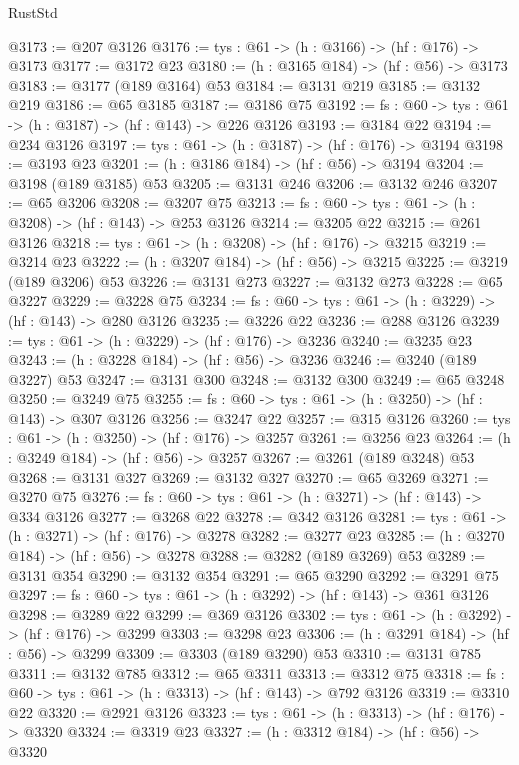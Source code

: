 \begin{lexlean}{RustStd}
\begin{coremodule}
@3173 := @207 @3126
@3176 := {tys : @61} -> (h : @3166) -> (hf : @176) -> @3173
@3177 := @3172 @23
@3180 := (h : @3165 @184) -> (hf : @56) -> @3173
@3183 := @3177 (@189 @3164) @53
@3184 := @3131 @219
@3185 := @3132 @219
@3186 := @65 @3185
@3187 := @3186 @75
@3192 := {fs : @60} -> {tys : @61} -> (h : @3187) -> (hf : @143) -> @226 @3126
@3193 := @3184 @22
@3194 := @234 @3126
@3197 := {tys : @61} -> (h : @3187) -> (hf : @176) -> @3194
@3198 := @3193 @23
@3201 := (h : @3186 @184) -> (hf : @56) -> @3194
@3204 := @3198 (@189 @3185) @53
@3205 := @3131 @246
@3206 := @3132 @246
@3207 := @65 @3206
@3208 := @3207 @75
@3213 := {fs : @60} -> {tys : @61} -> (h : @3208) -> (hf : @143) -> @253 @3126
@3214 := @3205 @22
@3215 := @261 @3126
@3218 := {tys : @61} -> (h : @3208) -> (hf : @176) -> @3215
@3219 := @3214 @23
@3222 := (h : @3207 @184) -> (hf : @56) -> @3215
@3225 := @3219 (@189 @3206) @53
@3226 := @3131 @273
@3227 := @3132 @273
@3228 := @65 @3227
@3229 := @3228 @75
@3234 := {fs : @60} -> {tys : @61} -> (h : @3229) -> (hf : @143) -> @280 @3126
@3235 := @3226 @22
@3236 := @288 @3126
@3239 := {tys : @61} -> (h : @3229) -> (hf : @176) -> @3236
@3240 := @3235 @23
@3243 := (h : @3228 @184) -> (hf : @56) -> @3236
@3246 := @3240 (@189 @3227) @53
@3247 := @3131 @300
@3248 := @3132 @300
@3249 := @65 @3248
@3250 := @3249 @75
@3255 := {fs : @60} -> {tys : @61} -> (h : @3250) -> (hf : @143) -> @307 @3126
@3256 := @3247 @22
@3257 := @315 @3126
@3260 := {tys : @61} -> (h : @3250) -> (hf : @176) -> @3257
@3261 := @3256 @23
@3264 := (h : @3249 @184) -> (hf : @56) -> @3257
@3267 := @3261 (@189 @3248) @53
@3268 := @3131 @327
@3269 := @3132 @327
@3270 := @65 @3269
@3271 := @3270 @75
@3276 := {fs : @60} -> {tys : @61} -> (h : @3271) -> (hf : @143) -> @334 @3126
@3277 := @3268 @22
@3278 := @342 @3126
@3281 := {tys : @61} -> (h : @3271) -> (hf : @176) -> @3278
@3282 := @3277 @23
@3285 := (h : @3270 @184) -> (hf : @56) -> @3278
@3288 := @3282 (@189 @3269) @53
@3289 := @3131 @354
@3290 := @3132 @354
@3291 := @65 @3290
@3292 := @3291 @75
@3297 := {fs : @60} -> {tys : @61} -> (h : @3292) -> (hf : @143) -> @361 @3126
@3298 := @3289 @22
@3299 := @369 @3126
@3302 := {tys : @61} -> (h : @3292) -> (hf : @176) -> @3299
@3303 := @3298 @23
@3306 := (h : @3291 @184) -> (hf : @56) -> @3299
@3309 := @3303 (@189 @3290) @53
@3310 := @3131 @785
@3311 := @3132 @785
@3312 := @65 @3311
@3313 := @3312 @75
@3318 := {fs : @60} -> {tys : @61} -> (h : @3313) -> (hf : @143) -> @792 @3126
@3319 := @3310 @22
@3320 := @2921 @3126
@3323 := {tys : @61} -> (h : @3313) -> (hf : @176) -> @3320
@3324 := @3319 @23
@3327 := (h : @3312 @184) -> (hf : @56) -> @3320

\end{coremodule}
\end{lexlean}
